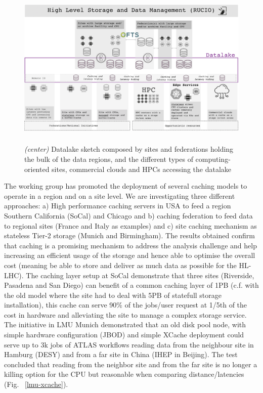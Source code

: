 \begin{figure}
  \centering
  \includegraphics[height=7.8cm]{datalake-sketch-square.png}
  \caption{{\em (center)} Datalake sketch composed by sites and federations holding the bulk of the data regions, and the different types of computing-oriented sites, commercial clouds and HPCs accessing the datalake }
  \label{datalake-sketch}
\end{figure}
The working group has promoted the deployment of several caching models to operate in a region and on a site level. We are investigating three different approaches: a) High performance caching servers in USA to feed a region Southern California (SoCal) and Chicago and b) caching federation to feed data to regional sites (France and Italy as examples) and c) site caching mechanism as stateless Tier-2 storage (Munich and Birmingham). The results obtained confirm that caching is a promising mechanism to address the analysis challenge and help increasing an efficient usage of the storage and hence able to optimise the overall cost (meaning be able to store and deliver as much data as possible for the HL-LHC). The caching layer setup at SoCal demonstrate that three sites (Riverside, Pasadena and San Diego) can benefit of a common caching layer of 1PB (c.f. with the old model where the site had to deal with 5PB of statefull storage installation), this cache can serve 90\% of the jobs/user request at 1/5th of the cost in hardware and alleviating the site to manage a complex storage service.\\
The initiative in LMU Munich demonstrated that an old disk pool node, with simple hardware configuration (JBOD) and simple XCache deployment could serve up to 3k jobs of ATLAS workflows reading data from the neighbour site in Hamburg (DESY) and from a far site in China (IHEP in Beijing). The test concluded that reading from the neighbor site and from the far site is no longer a killing option for the CPU but reasonable when comparing distance/latencies (Fig. ~\ref{lmu-xcache}).

